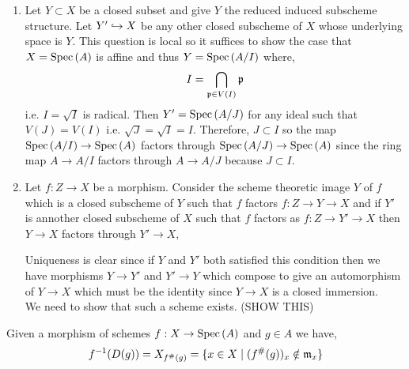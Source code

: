 \documentclass[12pt]{article}
\begin{document}
\begin{enumerate}
\item Let $Y \subset X$ be a closed subset and give $Y$ the reduced induced subscheme structure. Let $Y' \hookrightarrow X$ be any other closed subscheme of $X$ whose underlying space is $Y$. This question is local so it suffices to show the case that $X = \mathrm{Spec}\left( A \right)$ is affine and thus $Y = \mathrm{Spec}\left( A / I \right)$ where,
\[ I = \bigcap_{\mathfrak{p} \in V(I)} \mathfrak{p} \]
i.e. $I = \sqrt{I}$ is radical. Then $Y' = \mathrm{Spec}\left( A / J \right)$ for any ideal such that $V(J) = V(I)$ i.e. $\sqrt{J} = \sqrt{I} = I$. Therefore, $J \subset I$ so  the map $\mathrm{Spec}\left( A / I \right) \to \mathrm{Spec}\left( A \right)$ factors through $\mathrm{Spec}\left( A/J \right) \to \mathrm{Spec}\left( A \right)$ since the ring map $A \to A / I$ factors through $A \to A / J$ because $J \subset I$.  

\item Let $f : Z \to X$ be a morphism. Consider the scheme theoretic image $Y$ of $f$ which is a closed subscheme of $Y$ such that $f$ factors $f : Z \to Y \to X$ and if $Y'$ is annother closed subscheme of $X$ such that $f$ factors as $f : Z \to Y' \to X$ then $Y \to X$ factors through $Y' \to X$,
\begin{center}
\end{center}
Uniqueness is clear since if $Y$ and $Y'$ both satisfied this condition then we have morphisms $Y \to Y'$ and $Y' \to Y$ which compose to give an automorphism of $Y \to X$ which must be the identity since $Y \to X$ is a closed immersion.
\bigskip\\
We need to show that such a scheme exists. (SHOW THIS)
\end{enumerate}

\begin{lemma}
Given a morphism of schemes $f : X \to \mathrm{Spec}\left( A \right)$ and $g \in A$ we have, 
\[ f^{-1}(D(g)) = X_{f^\#(g)} = \{ x \in X \mid (f^\#(g))_x \notin \mathfrak{m}_x \} \]
\end{lemma}
\end{document}
